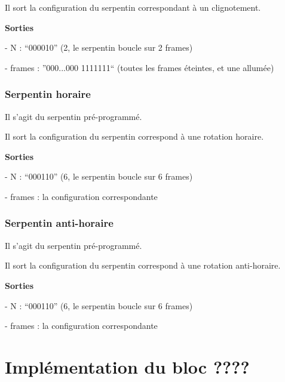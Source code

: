 \documentclass[10pt]{article}
\begin{document}
        Il sort la configuration du serpentin correspondant à un clignotement.
        
        \textbf{Sorties}
            
            - N : ``000010'' (2, le serpentin boucle sur 2 frames)
            
            - frames : ''000...000 1111111`` (toutes les frames éteintes, et une allumée)
        
        \subsubsection{Serpentin horaire}
        
        Il s'agit du serpentin pré-programmé.
        
        Il sort la configuration du serpentin correspond à une rotation horaire.
        
        \textbf{Sorties}
            
            - N : ``000110'' (6, le serpentin boucle sur 6 frames)
            
            - frames : la configuration correspondante
                
                
        \subsubsection{Serpentin anti-horaire}
        
        Il s'agit du serpentin pré-programmé.
        
        Il sort la configuration du serpentin correspond à une rotation anti-horaire.
        
        \textbf{Sorties}
            
            - N : ``000110'' (6, le serpentin boucle sur 6 frames)
            
            - frames : la configuration correspondante
            
                
    \newpage
    \section{Implémentation du bloc ????}
    
    
\end{document}

